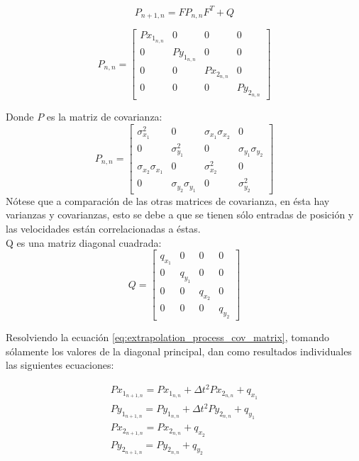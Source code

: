 \begin{equation}
P_{n+1,n} = F P_{n,n} F^T + Q
\label{eq:extrapolation_process_cov_matrix}
\end{equation}

\begin{equation}
P_{n,n} =
\begin{bmatrix}
Px_{1_{n,n}} & 0 & 0 & 0\\ 
0 & Py_{1_{n,n}} & 0 & 0\\ 
0 & 0 & Px_{2_{n,n}} & 0\\ 
0 & 0 & 0 & Py_{2_{n,n}}
\end{bmatrix}
\end{equation}	

Donde $P$ es la matriz de covarianza:
\begin{equation}
P_{n,n} =
\begin{bmatrix}
\sigma^2_{x_1} & 0 & \sigma_{x_1}\sigma_{x_2} & 0\\ 
0 & \sigma^2_{y_1} & 0 & \sigma_{y_1}\sigma_{y_2}\\ 
\sigma_{x_2}\sigma_{x_1} & 0 & \sigma^2_{x_2} & 0\\ 
0 & \sigma_{y_2}\sigma_{y_1} & 0 & \sigma^2_{y_2} 
\end{bmatrix}
\end{equation}	
Nótese que a comparación de las otras matrices de covarianza, en ésta hay varianzas y covarianzas, esto se debe a que se tienen sólo entradas de posición y las velocidades están correlacionadas a éstas.
\\
Q es una matriz diagonal cuadrada: 
\begin{equation}
Q =
\begin{bmatrix}
q_{x_1} & 0 & 0 & 0\\ 
0 & q_{y_1} & 0 & 0\\ 
0 & 0 & q_{x_2} & 0\\ 
0 & 0 & 0   & q_{y_2}
\end{bmatrix}
\end{equation}	

Resolviendo la ecuación \ref{eq:extrapolation_process_cov_matrix}, tomando sólamente los valores de la diagonal principal, dan como resultados individuales las siguientes ecuaciones:
	
\begin{eqnarray*}
	Px_{1_{n+1,n}} = Px_{1_{n,n}} + \Delta t^{2} Px_{2_{n,n}} + q_{x_1}\\
	Py_{1_{n+1,n}} = Py_{1_{n,n}} + \Delta t^{2} Py_{2_{n,n}} + q_{y_1}\\
	Px_{2_{n+1,n}} = Px_{2_{n,n}} 				    		  + q_{x_2}\\
	Py_{2_{n+1,n}} = Py_{2_{n,n}}							  + q_{y_2}\\
\end{eqnarray*}

